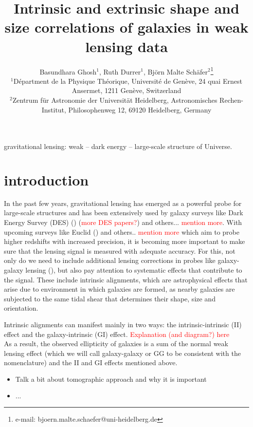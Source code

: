 \documentclass[a4paper,fleqn,usenatbib]{mnras}
\title[intrinsic size correlations]
{Intrinsic and extrinsic shape and size correlations of galaxies in weak lensing data}
\author[B. Ghosh, R. Durrer, B.M. Sch{\"a}fer]
{Basundhara Ghosh$^1$, Ruth Durrer$^1$, Bj{\"o}rn Malte Sch{\"a}fer$^2$\thanks{e-mail: bjoern.malte.schaefer@uni-heidelberg.de}\\
$^1$D{\'e}partment de la Physique Th{\'e}orique, Universit{\'e} de Gen{\`e}ve, 24 quai Ernest Ansermet, 1211 Gen{\`e}ve, Switzerland\\
$^2$Zentrum f{\"u}r Astronomie der Universit{\"a}t Heidelberg, Astronomisches Rechen-Institut, Philosophenweg 12, 69120 Heidelberg, Germany
}
\newcommand\BG[1]{\textcolor{red}{#1}}
\begin{document}
\pagerange{\pageref{firstpage}--\pageref{lastpage}}
\maketitle
\label{firstpage}


\begin{abstract}

\end{abstract}


\begin{keywords}
gravitational lensing: weak -- dark energy -- large-scale structure of Universe.
\end{keywords}


\section{introduction}\label{sect_intro}
In the past few years, gravitational lensing has emerged as a powerful probe for large-scale structures and has been extensively used by galaxy surveys like Dark Energy Survey (DES) (\cite{Abbott:2017wau}) (\BG{more DES papers?}) and others... \BG{mention more}. With upcoming surveys like Euclid (\cite{Amendola:2016saw}) and others.. \BG{mention more} which aim to probe higher redshifts with increased precision, it is becoming more important to make sure that the lensing signal is measured with adequate accuracy. For this, not only do we need to include additional lensing corrections in probes like galaxy-galaxy lensing (\cite{Ghosh:2018nsm}), but also pay attention to systematic effects that contribute to the signal. These include intrinsic alignments, which are astrophysical effects that arise due to environment in which galaxies are formed, as nearby galaxies are subjected to the same tidal shear that determines their shape, size and orientation.\par
Intrinsic alignments can manifest mainly in two ways: the intrinsic-intrinsic (II) effect and the galaxy-intrinsic (GI) effect. \BG{Explanation (and diagram?) here}\\
As a result, the observed ellipticity of galaxies is a sum of the normal weak lensing effect (which we will call galaxy-galaxy or GG to be consistent with the nomenclature) and the II and GI effects mentioned above.
\begin{itemize}
    \item Talk a bit about tomographic approach and why it is important
    \item ...
\end{itemize}
\end{document}
